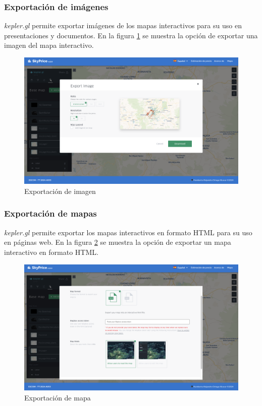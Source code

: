 \subsubsection{Exportación de imágenes}
\textit{kepler.gl} permite exportar imágenes de los mapas interactivos para su
uso en presentaciones y documentos. En la figura \ref{fig:avanzado-exportacion-imagen}
se muestra la opción de exportar una imagen del mapa interactivo.

\begin{figure}[H]
    \centering
    \includegraphics[width=1.0\textwidth]{imagenes/05-mapa-interactivo/avanzado-exportar-imagen.png}
    \caption{Exportación de imagen}
    \label{fig:avanzado-exportacion-imagen}
\end{figure}

\subsubsection{Exportación de mapas}
\textit{kepler.gl} permite exportar los mapas interactivos en formato HTML para
su uso en páginas web. En la figura \ref{fig:avanzado-exportacion-mapa} se muestra
la opción de exportar un mapa interactivo en formato HTML.

\begin{figure}[H]
    \centering
    \includegraphics[width=1.0\textwidth]{imagenes/05-mapa-interactivo/avanzado-exportar-mapa.png}
    \caption{Exportación de mapa}
    \label{fig:avanzado-exportacion-mapa}
\end{figure}

